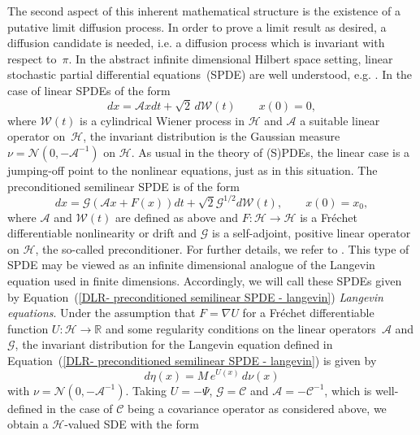 The second aspect of this inherent mathematical structure is the existence of a putative limit diffusion process. In order to prove a limit result as desired, a diffusion candidate is needed, i.e. a diffusion process which is invariant with respect to~$\pi$. In the abstract infinite dimensional Hilbert space setting, linear stochastic partial differential equations~(SPDE) are well understood, e.g. \autocite{DaPrato1992, Hairer2005, Hairer2007}. In the case of linear SPDEs  of the form
\begin{equation}
 dx =  \mathcal{A} x dt + \sqrt{2} \, d \mathcal{W}(t) \qquad x(0)  =0,
\end{equation}
where $ \mathcal{W}(t) $ is a cylindrical Wiener process in $\mathcal{H}$ and $\mathcal{A}$ a suitable linear operator on~$\mathcal{H}$, the invariant distribution is the Gaussian measure~$ \nu = \mathcal{N}(0, -\mathcal{A}^{-1})$ on $\mathcal{H}$. As usual in the theory of (S)PDEs, the linear case is a jumping-off point to the nonlinear equations, just as in this situation. The preconditioned semilinear SPDE is of the form
\begin{equation}
\label{DLR- preconditioned semilinear SPDE - langevin}
 dx = \mathcal{G} (\mathcal{A}x + F(x))dt + \sqrt{2}\mathcal{G}^{1/2} d\mathcal{W}(t), \qquad x(0) = x_0,
\end{equation}
where $\mathcal{A}$ and $\mathcal{W}(t)$ are defined as above and $F: \mathcal{H} \to \mathcal{H}$ is a Fr\'{e}chet differentiable nonlinearity or drift and $\mathcal{G}$ is a self-adjoint, positive linear operator on $\mathcal{H}$, the so-called preconditioner. For further details, we refer to \autocite{Hairer2005, Hairer2007}. This type of SPDE may be viewed as an infinite dimensional analogue of the Langevin equation used in finite dimensions. Accordingly, we will call these SPDEs given by Equation~(\ref{DLR- preconditioned semilinear SPDE - langevin}) \textit{Langevin equations}. Under the assumption that $F = \nabla U$ for a  Fr\'{e}chet differentiable function $U: \mathcal{H} \to \mathbb{R}$ and some regularity conditions on the linear operators~$\mathcal{A}$ and $\mathcal{G}$, the invariant distribution for the Langevin equation defined in Equation~(\ref{DLR- preconditioned semilinear SPDE - langevin}) is given by 
\begin{equation}
 d \eta (x) = M \, e^{U(x)} \, d \nu (x)
\end{equation}
with $\nu = \mathcal{N}(0, - \mathcal{A}^{-1})$. Taking $U = - \Psi$, $\mathcal{G}= \mathcal{C}$ and $\mathcal{A}= - \mathcal{C}^{-1}$, which is well-defined in the case of $\mathcal{C}$ being a covariance operator as considered above, we obtain a $ \mathcal{H} $-valued SDE with the form
